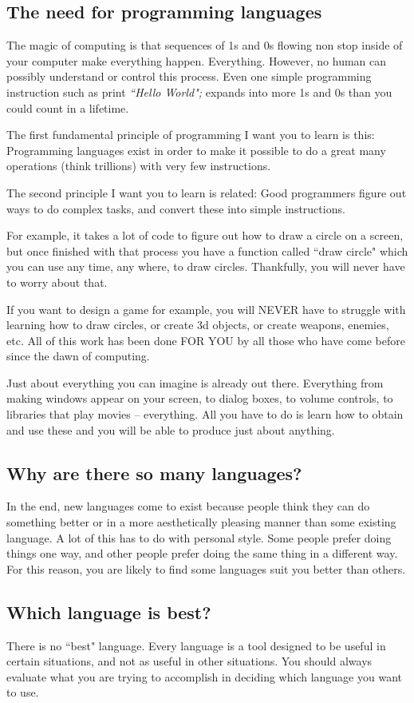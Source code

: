 \documentclass[a4paper,12pt]{article}
\begin{document}
\subsection{The need for programming languages}
The magic of computing is that sequences of 1s and 0s flowing non stop inside of your computer make everything happen. Everything. However, no human can possibly understand or control this process. Even one simple programming instruction such as print \emph{``Hello World";} expands into more 1s and 0s than you could count in a lifetime.

The first fundamental principle of programming I want you to learn is this: Programming languages exist in order to make it possible to do a great many operations (think trillions) with very few instructions.

The second principle I want you to learn is related: Good programmers figure out ways to do complex tasks, and convert these into simple instructions.

For example, it takes a lot of code to figure out how to draw a circle on a screen, but once finished with that process you have a function called ``draw circle" which you can use any time, any where, to draw circles. Thankfully, you will never have to worry about that.

If you want to design a game for example, you will NEVER have to struggle with learning how to draw circles, or create 3d objects, or create weapons, enemies, etc. All of this work has been done FOR YOU by all those who have come before since the dawn of computing.

Just about everything you can imagine is already out there. Everything from making windows appear on your screen, to dialog boxes, to volume controls, to libraries that play movies -- everything. All you have to do is learn how to obtain and use these and you will be able to produce just about anything.
\subsection{Why are there so many languages?}
In the end, new languages come to exist because people think they can do something better or in a more aesthetically pleasing manner than some existing language. A lot of this has to do with personal style. Some people prefer doing things one way, and other people prefer doing the same thing in a different way. For this reason, you are likely to find some languages suit you better than others.
\subsection{Which language is best?}
There is no ``best" language. Every language is a tool designed to be useful in certain situations, and not as useful in other situations. You should always evaluate what you are trying to accomplish in deciding which language you want to use.
\end{document}
